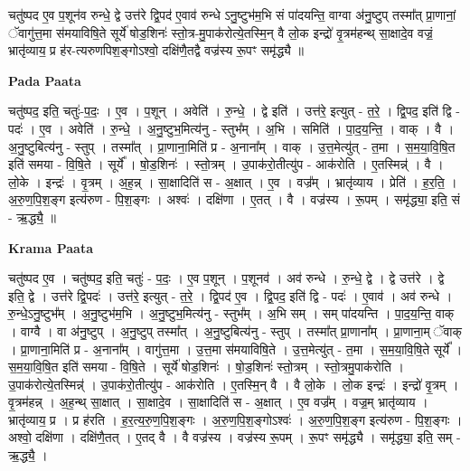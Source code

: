 \documentclass[17pt]{extarticle}
\begin{document}
चतु॑ष्पद ए॒व प॒शून॑व रुन्धे॒ द्वे उत्त॑रे द्वि॒पद॑ ए॒वाव॑ रुन्धे ऽनु॒ष्टुभ॑म॒भि सं पा॑दयन्ति॒ वाग्वा अ॑नु॒ष्टुप् तस्मा᳚त् प्रा॒णानां॒ ॅवागु॑त्त॒मा स॑मयाविषि॒ते सूर्ये॑ षोड॒शिनः॑ स्तो॒त्र-मु॒पाक॑रोत्ये॒तस्मि॒न् वै लो॒क इन्द्रो॑ वृ॒त्रम॑हन्थ् सा॒क्षादे॒व वज्रं॒ भ्रातृ॑व्याय॒ प्र ह॑र-त्यरुणपिश॒ङ्गोऽश्वो॒ दक्षि॑णै॒तद्वै वज्र॑स्य रू॒पꣳ समृ॑द्ध्यै ॥ \newline

\textbf{Pada Paata} \newline

चतु॑ष्पद॒ इति॒ चतुः॑-प॒दः॒ । ए॒व । प॒शून् । अवेति॑ । रु॒न्धे॒ । द्वे इति॑ । उत्त॑रे॒ इत्युत् - त॒रे॒ । द्वि॒पद॒ इति॑ द्वि - पदः॑ । ए॒व । अवेति॑ । रु॒न्धे॒ । अ॒नु॒ष्टुभ॒मित्य॑नु - स्तुभ᳚म् । अ॒भि । समिति॑ । पा॒द॒य॒न्ति॒ । वाक् । वै । अ॒नु॒ष्टुबित्य॑नु - स्तुप् । तस्मा᳚त् । प्रा॒णाना॒मिति॑ प्र - अ॒नाना᳚म् । वाक् । उ॒त्त॒मेत्यु॑त् - त॒मा । स॒म॒या॒वि॒षि॒त इति॑ समया - वि॒षि॒ते । सूर्ये᳚ । षो॒ड॒शिनः॑ । स्तो॒त्रम् । उ॒पाक॑रो॒तीत्यु॑प - आक॑रोति । ए॒तस्मिन्न्॑ । वै । लो॒के । इन्द्रः॑ । वृ॒त्रम् । अ॒ह॒न्न् । सा॒क्षादिति॑ स - अ॒क्षात् । ए॒व । वज्र᳚म् । भ्रातृ॑व्याय । प्रेति॑ । ह॒र॒ति॒ । अ॒रु॒ण॒पि॒श॒ङ्ग इत्य॑रुण - पि॒श॒ङ्गः । अश्वः॑ । दक्षि॑णा । ए॒तत् । वै । वज्र॑स्य । रू॒पम् । समृ॑द्ध्या॒ इति॒ सं - ऋ॒द्ध्यै॒ ॥  \newline


\textbf{Krama Paata} \newline

चतु॑ष्पद ए॒व । चतु॑ष्पद॒ इति॒ चतुः॑ - प॒दः॒ । ए॒व प॒शून् । प॒शूनव॑ । अव॑ रुन्धे । रु॒न्धे॒ द्वे । द्वे उत्त॑रे । द्वे इति॒ द्वे । उत्त॑रे द्वि॒पदः॑ । उत्त॑रे॒ इत्युत् - त॒रे॒ । द्वि॒पद॑ ए॒व । द्वि॒पद॒ इति॑ द्वि - पदः॑ । ए॒वाव॑ । अव॑ रुन्धे । रु॒न्धे॒ऽनु॒ष्टुभ᳚म् । अ॒नु॒ष्टुभ॑म॒भि । अ॒नु॒ष्टुभ॒मित्य॑नु - स्तुभ᳚म् । अ॒भि सम् । सम् पा॑दयन्ति । पा॒द॒य॒न्ति॒ वाक् । वाग्वै । वा अ॑नु॒ष्टुप् । अ॒नु॒ष्टुप् तस्मा᳚त् । अ॒नु॒ष्टुबित्य॑नु - स्तुप् । तस्मा᳚त् प्रा॒णाना᳚म् । प्रा॒णाना॒म् ॅवाक् । प्रा॒णाना॒मिति॑ प्र - अ॒नाना᳚म् । वागु॑त्त॒मा । उ॒त्त॒मा स॑मयाविषि॒ते । उ॒त्त॒मेत्यु॑त् - त॒मा । स॒म॒या॒वि॒षि॒ते सूर्ये᳚ । स॒म॒या॒वि॒षि॒त इति॑ समया - वि॒षि॒ते । सूर्ये॑ षोड॒शिनः॑ । षो॒ड॒शिनः॑ स्तो॒त्रम् । स्तो॒त्रमु॒पाक॑रोति । उ॒पाक॑रोत्ये॒तस्मिन्न्॑ । उ॒पाक॑रो॒तीत्यु॑प - आक॑रोति । ए॒तस्मि॒न् वै । वै लो॒के । लो॒क इन्द्रः॑ । इन्द्रो॑ वृ॒त्रम् । वृ॒त्रम॑हन्न् । अ॒ह॒न्थ् सा॒क्षात् । सा॒क्षादे॒व । सा॒क्षादिति॑ स - अ॒क्षात् । ए॒व वज्र᳚म् । वज्र॒म् भ्रातृ॑व्याय । भ्रातृ॑व्याय॒ प्र । प्र ह॑रति । ह॒र॒त्य॒रु॒ण॒पि॒श॒ङ्‍गः । अ॒रु॒ण॒पि॒श॒ङ्‍गोऽश्वः॑ । अ॒रु॒ण॒पि॒श॒ङ्‍ग इत्य॑रुण - पि॒श॒ङ्‍गः । अश्वो॒ दक्षि॑णा । दक्षि॑णै॒तत् । ए॒तद् वै । वै वज्र॑स्य । वज्र॑स्य रू॒पम् । रू॒पꣳ समृ॑द्ध्यै । समृ॑द्ध्या॒ इति॒ सम् - ऋ॒द्ध्यै॒ । \newline
\end{document}
